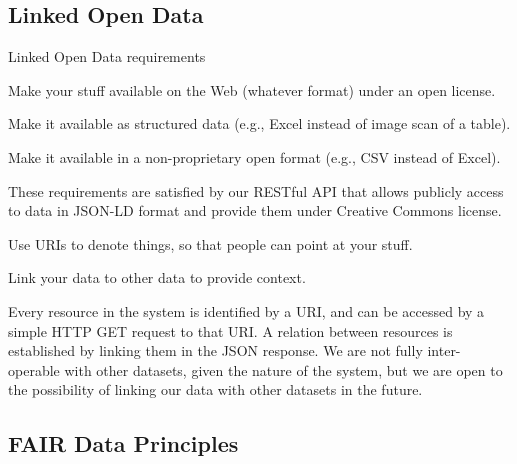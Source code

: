 \subsection{Linked Open Data}

\begin{frame}[allowframebreaks]{Linked Open Data\autocite{Berners-Lee_2006} requirements}
	\begin{block}{\faStar\faStarO\faStarO\faStarO\faStarO}
		Make your stuff available on the Web (whatever format) under an open
		license.
	\end{block}
	\vspace*{-8pt}
	\begin{block}{\faStar\faStar\faStarO\faStarO\faStarO}
		Make it available as structured data (e.g., Excel instead of image scan
		of a table).
	\end{block}
	\vspace*{-8pt}
	\begin{block}{\faStar\faStar\faStar\faStarO\faStarO}
		Make it available in a non-proprietary open format (e.g., CSV instead of
		Excel).
	\end{block}
	These requirements are satisfied by our RESTful API that allows
	publicly access to data in JSON-LD\autocite{Sporny_2014} format and provide
	them under Creative Commons license.

	\framebreak

	\begin{block}{\faStar\faStar\faStar\faStar\faStarO}
		Use URIs to denote things, so that people can point at your stuff.
	\end{block}
	\vspace*{-8pt}
	\begin{block}{\faStar\faStar\faStar\faStar\faStar}
		Link your data to \textcolor{UNITSCherry}{other} data to provide context.
	\end{block}
	Every resource in the system is identified by a URI, and can be accessed
	by a simple HTTP GET request to that URI. A relation between resources
	is established by linking them in the JSON response.
	We are not fully inter-operable with other datasets, given the nature of the
	system, but we are open to the possibility of linking our data with
	other datasets in the future.
\end{frame}

\subsection{FAIR Data Principles}


